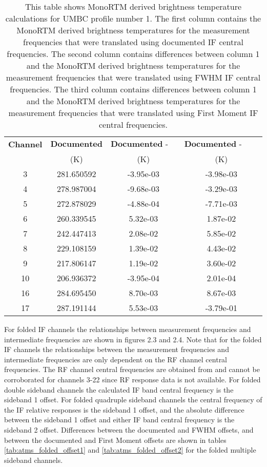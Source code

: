 \begin{table}[htp]
  \centering
  \begin{tabular}{|c|c|c|c|}
    \hline
    \textbf{Channel} & $\textbf{Documented}$ & $\textbf{Documented - FWHM} $ & $\textbf{Documented - First Moment} $  \\
    & (K)  & (K)   & (K) \\               
    \hline\hline 
    3   &  281.650592     &  -3.95e-03   &  -3.98e-03 \\  
    4   &  278.987004     &  -9.68e-03   &  -3.29e-03 \\  
    5   &  272.878029     &  -4.88e-04   &  -7.71e-03 \\ 
    6   &  260.339545     &   5.32e-03   &   1.87e-02 \\
    7   &  242.447413     &   2.08e-02   &   5.85e-02 \\ 
    8   &  229.108159     &   1.39e-02   &   4.43e-02 \\ 
    9   &  217.806147     &   1.19e-02   &   3.60e-02 \\ 
    10  &  206.936372     &  -3.95e-04   &   2.01e-04 \\ 
    16  &  284.695450     &   8.70e-03   &   8.67e-03 \\ 
    17  &  287.191144     &   5.53e-03   &  -3.79e-01 \\
    \hline
  \end{tabular}
  \caption{This table shows MonoRTM derived brightness temperature calculations for UMBC profile number 1. The first column contains the MonoRTM derived brightness
  temperatures for the measurement frequencies that were translated using documented IF central frequencies. The second column contains differences between column 1 and
   the MonoRTM derived brightness temperatures for the measurement frequencies that were translated using FWHM IF central frequencies. The third column contains differences between column 1 and
   the MonoRTM derived brightness temperatures for the measurement frequencies that were translated using First Moment IF central frequencies.}
  \label{tab:radiometric_impact}
\end{table}

For folded IF channels the relationships between measurement frequencies and intermediate frequencies are shown in
figures 2.3 and 2.4. Note that for the folded IF channels the relationships between the measurement frequencies and intermediate frequencies are only dependent on the RF channel central frequencies. The RF channel central frequencies are obtained from \cite{CrIS_EDR_ATBD} and cannot be corroborated for channels 3-22 since RF response data is not available. For folded double sideband channels the calculated IF band central frequency is the sideband 1 offset. For folded quadruple sideband channels the central frequency of the IF relative responses is the sideband 1 offset, and the absolute difference between the sideband 1 offset and either IF band central frequency is the sideband 2 offset. Differences between the documented and FWHM offsets, and between the documented and First Moment offsets are shown in tables \ref{tab:atms_folded_offset1} and \ref{tab:atms_folded_offset2} for the folded multiple sideband channels. 

